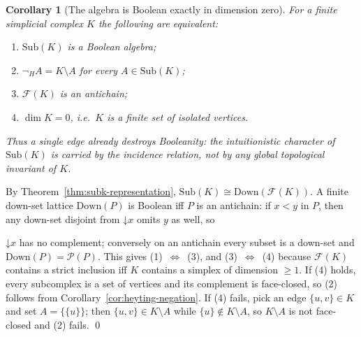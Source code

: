 \documentclass[final,12pt]{elsarticle}
\theoremstyle{plain}
\newtheorem{cor}[thm]{Corollary}
\theoremstyle{definition}
\begin{document}
\begin{cor}[The algebra is Boolean exactly in dimension zero]
\label{cor:boolean-iff-discrete}
For a finite simplicial complex \(K\) the following are equivalent:
\begin{enumerate}
  \item \(\mathrm{Sub}(K)\) is a Boolean algebra;
  \item \(\neg_H A = K \setminus A\) for every \(A \in \mathrm{Sub}(K)\);
  \item \(\mathcal F(K)\) is an antichain;
  \item \(\dim K = 0\), i.e.\ \(K\) is a finite set of isolated vertices.
\end{enumerate}
Thus a single edge already destroys Booleanity: the intuitionistic character of
\(\mathrm{Sub}(K)\) is carried by the incidence relation, not by any global
topological invariant of \(K\).
\end{cor}

\proof
By Theorem~\ref{thm:subk-representation},
\(\mathrm{Sub}(K) \cong \mathrm{Down}(\mathcal F(K))\). A finite down-set lattice
\(\mathrm{Down}(P)\) is Boolean iff \(P\) is an antichain: if \(x < y\) in \(P\),
then any down-set disjoint from \(\mathord{\downarrow}x\) omits \(y\) as well, so

\(\mathord{\downarrow}x\) has no complement; conversely on an antichain every
subset is a down-set and \(\mathrm{Down}(P) = \mathcal P(P)\). This gives
(1)~\(\Leftrightarrow\)~(3), and (3)~\(\Leftrightarrow\)~(4) because
\(\mathcal F(K)\) contains a strict inclusion iff \(K\) contains a simplex of
dimension \(\ge 1\). If (4) holds, every subcomplex is a set of vertices and its
complement is face-closed, so (2) follows from
Corollary~\ref{cor:heyting-negation}. If (4) fails, pick an edge
\(\{u,v\} \in K\) and set \(A = \{\{u\}\}\); then \(\{u,v\} \in K \setminus A\)
while \(\{u\} \notin K \setminus A\), so \(K \setminus A\) is not face-closed and
(2) fails.
\qed
\end{document}
